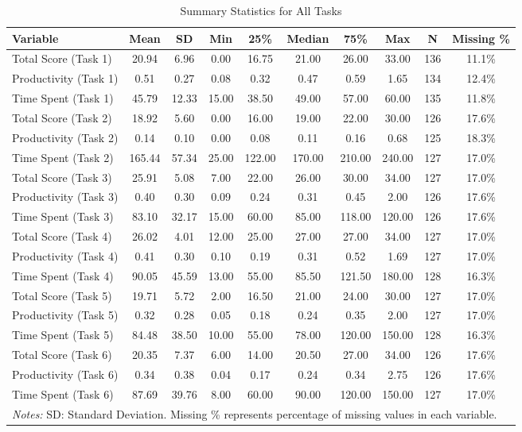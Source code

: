 \begin{table}[!htbp]
\centering
\caption{Summary Statistics for All Tasks}
\label{tab:summary_stats}
\begin{tabular}{lccccccccc}
\hline\hline
Variable & Mean & SD & Min & 25\% & Median & 75\% & Max & N & Missing \% \\
\hline
Total Score (Task 1) & 20.94 & 6.96 & 0.00 & 16.75 & 21.00 & 26.00 & 33.00 & 136 & 11.1\% \\
Productivity (Task 1) & 0.51 & 0.27 & 0.08 & 0.32 & 0.47 & 0.59 & 1.65 & 134 & 12.4\% \\
Time Spent (Task 1) & 45.79 & 12.33 & 15.00 & 38.50 & 49.00 & 57.00 & 60.00 & 135 & 11.8\% \\
Total Score (Task 2) & 18.92 & 5.60 & 0.00 & 16.00 & 19.00 & 22.00 & 30.00 & 126 & 17.6\% \\
Productivity (Task 2) & 0.14 & 0.10 & 0.00 & 0.08 & 0.11 & 0.16 & 0.68 & 125 & 18.3\% \\
Time Spent (Task 2) & 165.44 & 57.34 & 25.00 & 122.00 & 170.00 & 210.00 & 240.00 & 127 & 17.0\% \\
Total Score (Task 3) & 25.91 & 5.08 & 7.00 & 22.00 & 26.00 & 30.00 & 34.00 & 127 & 17.0\% \\
Productivity (Task 3) & 0.40 & 0.30 & 0.09 & 0.24 & 0.31 & 0.45 & 2.00 & 126 & 17.6\% \\
Time Spent (Task 3) & 83.10 & 32.17 & 15.00 & 60.00 & 85.00 & 118.00 & 120.00 & 126 & 17.6\% \\
Total Score (Task 4) & 26.02 & 4.01 & 12.00 & 25.00 & 27.00 & 27.00 & 34.00 & 127 & 17.0\% \\
Productivity (Task 4) & 0.41 & 0.30 & 0.10 & 0.19 & 0.31 & 0.52 & 1.69 & 127 & 17.0\% \\
Time Spent (Task 4) & 90.05 & 45.59 & 13.00 & 55.00 & 85.50 & 121.50 & 180.00 & 128 & 16.3\% \\
Total Score (Task 5) & 19.71 & 5.72 & 2.00 & 16.50 & 21.00 & 24.00 & 30.00 & 127 & 17.0\% \\
Productivity (Task 5) & 0.32 & 0.28 & 0.05 & 0.18 & 0.24 & 0.35 & 2.00 & 127 & 17.0\% \\
Time Spent (Task 5) & 84.48 & 38.50 & 10.00 & 55.00 & 78.00 & 120.00 & 150.00 & 128 & 16.3\% \\
Total Score (Task 6) & 20.35 & 7.37 & 6.00 & 14.00 & 20.50 & 27.00 & 34.00 & 126 & 17.6\% \\
Productivity (Task 6) & 0.34 & 0.38 & 0.04 & 0.17 & 0.24 & 0.34 & 2.75 & 126 & 17.6\% \\
Time Spent (Task 6) & 87.69 & 39.76 & 8.00 & 60.00 & 90.00 & 120.00 & 150.00 & 127 & 17.0\% \\
\hline
\multicolumn{10}{p{0.95\linewidth}}{\footnotesize \textit{Notes:} 
SD: Standard Deviation. Missing \% represents percentage of missing values in each variable.} \\
\end{tabular}
\end{table}